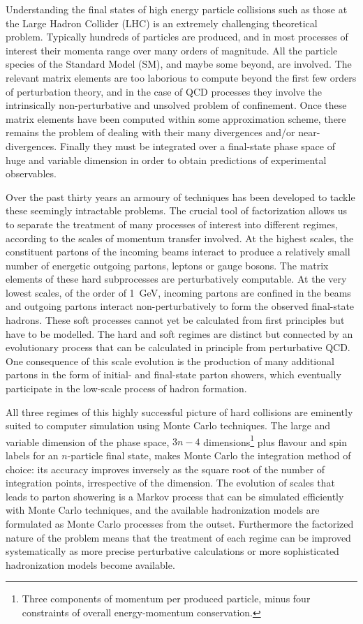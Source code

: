 Understanding the final states of high energy particle
collisions such as those at the Large Hadron Collider (LHC) is an extremely challenging
theoretical problem.  Typically hundreds of particles are produced,
and in most processes of interest their momenta range over
many orders of magnitude.  All the particle species of the Standard
Model (SM), and maybe some beyond, are involved.  The relevant matrix
elements are too laborious to compute beyond the first few orders of
perturbation theory, and in the case of QCD processes they involve the
intrinsically non-perturbative and unsolved problem of confinement.
Once these matrix elements have been computed within some
approximation scheme, there remains the problem of dealing with their
many divergences and/or near-divergences.  Finally they must be
integrated over a final-state phase space of huge and variable
dimension in order to obtain predictions of experimental observables.

Over the past thirty years an armoury of techniques has been developed
to tackle these seemingly intractable problems.  The crucial tool
of factorization allows us to separate the treatment of many processes
of interest into different regimes, according to the scales of
momentum transfer involved.  At the highest scales, the constituent
partons of the incoming beams interact to produce a relatively small
number of energetic outgoing partons, leptons or gauge bosons.  The matrix
elements of these hard subprocesses are perturbatively computable.
At the very lowest scales, of the order of 1~GeV, incoming partons are
confined in the beams and outgoing partons interact non-perturbatively
to form the observed final-state hadrons.  These soft processes cannot
yet be calculated from first principles but have to be modelled.
The hard and soft regimes are distinct but connected
by an evolutionary process that can be calculated in principle from
perturbative QCD.  One consequence of this scale evolution is the
production of many additional partons in the form of initial- and
final-state parton showers, which eventually participate in the
low-scale process of hadron formation.

All three regimes of this highly successful picture of hard collisions
are eminently suited to computer simulation using Monte Carlo
techniques.  The large and variable dimension of the phase space,
$3n-4$ dimensions\footnote{Three components of momentum per produced
  particle,  minus four constraints of overall energy-momentum
  conservation.}
plus flavour and spin labels for an $n$-particle final state,  makes Monte
Carlo the integration method of choice: its accuracy improves inversely as the
square root of the number of integration points, irrespective of the dimension.
The evolution of scales that leads to parton showering is a
Markov process that can be simulated efficiently with Monte Carlo
techniques, and the available hadronization models are
formulated as Monte Carlo processes from the outset. 
Furthermore the factorized nature of the
problem means that the treatment of each regime can be improved
systematically as more precise perturbative calculations or more
sophisticated hadronization models become available.   

